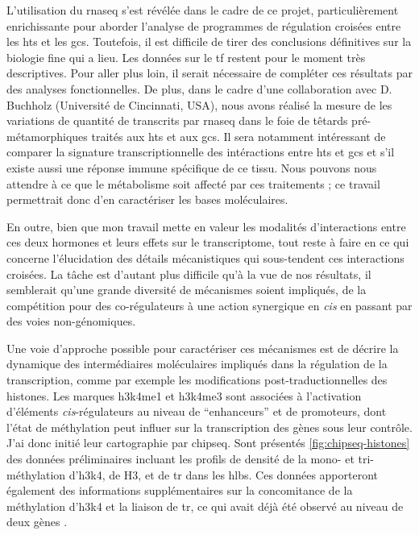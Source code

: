 \documentclass[../main.tex]{subfiles}
\begin{document}
	L'utilisation du \gls{rnaseq} s'est révélée dans le cadre de ce projet, particulièrement enrichissante pour aborder l'analyse de programmes de régulation croisées entre les \glspl{ht} et les \glspl{gc}.
	Toutefois, il est difficile de tirer des conclusions définitives sur la biologie fine qui a lieu.
	Les données sur le \gls{tf} restent pour le moment très descriptives.
	Pour aller plus loin, il serait nécessaire de compléter ces résultats par des analyses fonctionnelles.
	De plus, dans le cadre d'une collaboration avec D. Buchholz (Université de Cincinnati, USA), nous avons réalisé la mesure de les variations de quantité de transcrits par \gls{rnaseq} dans le foie de têtards pré-métamorphiques traités aux \glspl{ht} et aux \glspl{gc}.
	Il sera notamment intéressant de comparer la signature transcriptionnelle des intéractions entre \glspl{ht} et \glspl{gc} et s'il existe aussi une réponse immune spécifique de ce tissu.
	Nous pouvons nous attendre à ce que le métabolisme soit affecté par ces traitements ; ce travail permettrait donc d'en caractériser les bases moléculaires.
	\par
	En outre, bien que mon travail mette en valeur les modalités d'interactions entre ces deux hormones et leurs effets sur le transcriptome, tout reste à faire en ce qui concerne l'élucidation des détails mécanistiques qui sous-tendent ces interactions croisées.
	La tâche est d'autant plus difficile qu'à la vue de nos résultats, il semblerait qu'une grande diversité de mécanismes soient impliqués, de la compétition pour des co-régulateurs à une action synergique en \textit{cis} en passant par des voies non-génomiques.
	\par
	Une voie d'approche possible pour caractériser ces mécanismes est de décrire la dynamique des intermédiaires moléculaires impliqués dans la régulation de la transcription, comme par exemple les modifications post-traductionnelles des histones.
	Les marques \gls{h3k4me1} et \gls{h3k4me3} sont associées à l'activation d'éléments \textit{cis}-régulateurs au niveau de ``enhanceurs'' et de promoteurs, dont l'état de méthylation peut influer sur la transcription des gènes sous leur contrôle.
	J'ai donc initié leur cartographie par \gls{chipseq}.
	Sont présentés \autoref{fig:chipseq-histones} des données préliminaires incluant les profils de densité de la mono- et tri-méthylation d'\gls{h3k4}, de H3, et de \gls{tr} dans les \glspl{hlb}.
	Ces données apporteront également des informations supplémentaires sur la concomitance de la méthylation d'\gls{h3k4} et la liaison de \gls{tr}, ce qui avait déjà été observé au niveau de deux gènes \citep{Bilesimo2011}.
\end{document}
